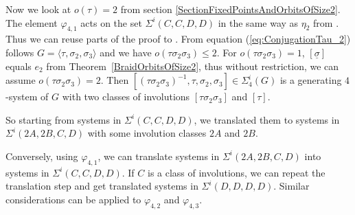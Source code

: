 \documentclass[12pt,a4paper]{article}
\numberwithin{equation}{section}
\numberwithin{table}{section}
\begin{document}
Now we look at $o(\tau)=2$ from section \ref{SectionFixedPointsAndOrbitsOfSize2}. The element $\varphi_{4,1}$ acts on
the set $\Sigma^i(C,C,D,D)$ in the same way as $\eta_2$ from \cite[III, §2, Satz 3]{RefMat1987}.
Thus we can reuse parts of the proof to \cite[III, §2, Satz 5(b)]{RefMat1987}.
From equation (\ref{eq:ConjugationTau_2}) follows $G=\langle \tau, \sigma_2, \sigma_3 \rangle$
and we have $o(\tau \sigma_2 \sigma_3) \leq 2$.
For $o(\tau \sigma_2 \sigma_3)=1$, $[\underline{\sigma}]$ equals $e_2$ from Theorem~\ref{BraidOrbitsOfSize2},
thus without restriction, we can assume $o(\tau \sigma_2 \sigma_3)=2$.
Then $[(\tau \sigma_2 \sigma_3)^{-1}, \tau, \sigma_2, \sigma_3] \in \Sigma^i_4(G)$
is a generating $4$-system of $G$ with two classes of involutions $[\tau \sigma_2 \sigma_3]$ and $[\tau]$.
\par
\noindent
So starting from systems in $\Sigma^i(C,C,D,D)$, we translated them to systems in $\Sigma^i(2A,2B,C,D)$
with some involution classes $2A$ and $2B$.
\par
\noindent
Conversely, using $\varphi_{4,1}$, we can translate systems in $\Sigma^i(2A,2B,C,D)$ into systems
in $\Sigma^i(C,C,D,D)$. If $C$ is a class of involutions, we can repeat the translation step and
get translated systems in $\Sigma^i(D,D,D,D)$.
Similar considerations can be applied to $\varphi_{4,2}$ and $\varphi_{4,3}$.
%
\end{document}

